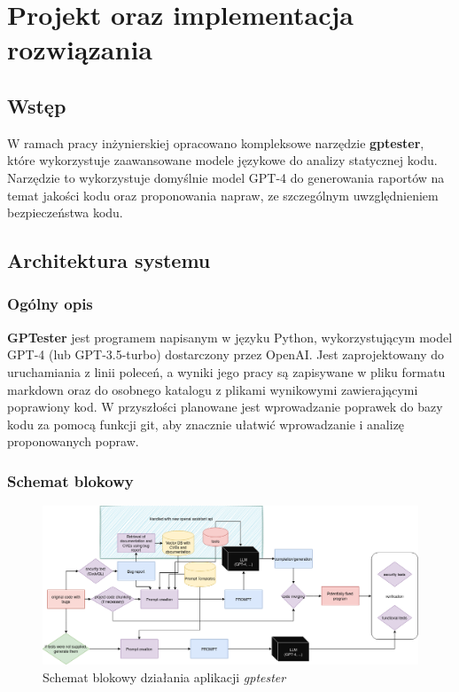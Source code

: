 
\chapter{Projekt oraz implementacja rozwiązania}

\section{Wstęp}
W ramach pracy inżynierskiej opracowano kompleksowe narzędzie \textbf{gptester}, które wykorzystuje zaawansowane modele językowe do analizy statycznej kodu.
Narzędzie to wykorzystuje domyślnie model GPT-4 do generowania raportów na temat jakości kodu oraz proponowania napraw, ze szczególnym uwzględnieniem bezpieczeństwa kodu.

\section{Architektura systemu}
\subsection{Ogólny opis}
\textbf{GPTester} jest programem napisanym w języku Python, wykorzystującym model GPT-4 (lub GPT-3.5-turbo) dostarczony przez OpenAI.
Jest zaprojektowany do uruchamiania z linii poleceń, a wyniki jego pracy są zapisywane w pliku formatu markdown oraz do osobnego katalogu z plikami wynikowymi zawierającymi poprawiony kod.
W przyszłości planowane jest wprowadzanie poprawek do bazy kodu za pomocą funkcji git, aby znacznie ułatwić wprowadzanie i analizę proponowanych popraw.

\subsection{Schemat blokowy}
\label{subsec:schemat_blokowy}

\begin{landscape}
\begin{figure}[p]
    \centering
    \includegraphics[width=\linewidth]{img/gptester.drawio.png}
    \caption{Schemat blokowy działania aplikacji \textit{gptester}}
    \label{fig:schemat_blokowy}
\end{figure}
\end{landscape}

